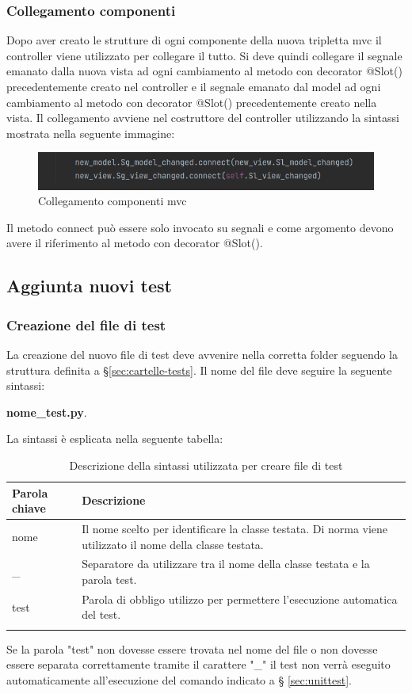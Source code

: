 \subsubsection{Collegamento componenti}
Dopo aver creato le strutture di ogni componente della nuova tripletta mvc il controller viene utilizzato per collegare il tutto. 
Si deve quindi collegare il segnale emanato dalla nuova vista ad ogni cambiamento al metodo con decorator @Slot() precedentemente creato nel controller e il segnale emanato dal model ad ogni cambiamento al metodo con decorator @Slot() precedentemente creato nella vista. Il collegamento avviene nel costruttore del controller utilizzando la sintassi mostrata nella seguente immagine:
\begin{figure}[H]
    \centering
    \includegraphics[scale = 0.50]{components/img/collegamento-segnali-mvc.png}
    \caption{Collegamento componenti mvc}
    \label{fig:Collegamento componenti mvc}
\end{figure}
Il metodo connect può essere solo invocato su segnali e come argomento devono avere il riferimento al metodo con decorator @Slot().

\subsection{Aggiunta nuovi test}
\subsubsection{Creazione del file di test}
La creazione del nuovo file di test deve avvenire nella corretta folder seguendo la struttura definita a \S{}\ref{sec:cartelle-tests}. Il nome del file deve seguire la seguente sintassi: \newline{} \centerline{\textbf{nome\_test.py}.} La sintassi è esplicata nella seguente tabella:
{
	\setlength{\freewidth}{\dimexpr\textwidth-1\tabcolsep}
	\renewcommand{\arraystretch}{1.5}
	\setlength{\aboverulesep}{0pt}
	\setlength{\belowrulesep}{0pt}
	\begin{longtable}{L{.15\freewidth} L{.85\freewidth}}
		\textbf{Parola chiave} & \textbf{Descrizione}\\
		\toprule
		\endhead	
		nome & Il nome scelto per identificare la classe testata. Di norma viene utilizzato il nome della classe testata.\\
		\_ & Separatore da utilizzare tra il nome della classe testata e la parola test.\\
		test & Parola di obbligo utilizzo per permettere l'esecuzione automatica del test. \\
		\bottomrule
		\hiderowcolors
		\caption{Descrizione della sintassi utilizzata per creare file di test}
	\end{longtable}
}
Se la parola "test" non dovesse essere trovata nel nome del file o non dovesse essere separata correttamente tramite il carattere "\_" il test non verrà eseguito automaticamente all'esecuzione del comando indicato a \S{} \ref{sec:unittest}.


